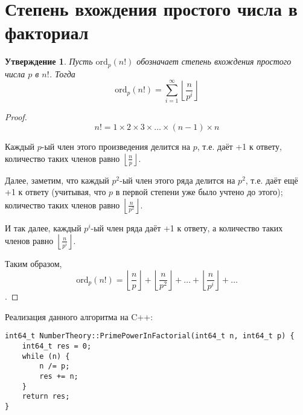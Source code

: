 \documentclass[12pt, a4paper, openany]{book}
\newtheorem*{statement}{Утверждение}
\begin{document}
\section{Степень вхождения простого числа в факториал}

\begin{statement}
Пусть $\text{ord}_p(n!)$ обозначает степень вхождения простого числа $p$ в $n!$. Тогда
\[\text{ord}_p(n!) = \sum_{i=1}^{\infty} \left\lfloor \frac{n}{p^i} \right\rfloor\]
\end{statement}

\begin{proof}
\[n! = 1 \times 2 \times 3 \times \ldots \times (n-1) \times n\]

Каждый $p$-ый член этого произведения делится на $p$, т.е. даёт +1 к ответу, количество таких членов равно $\left\lfloor \frac{n}{p} \right\rfloor.$

Далее, заметим, что каждый $p^2$-ый член этого ряда делится на $p^2$, т.е. даёт ещё +1 к ответу (учитывая, что $p$ в первой степени уже было учтено до этого); количество таких членов равно $\left\lfloor \frac{n}{p^2} \right\rfloor$.

И так далее, каждый $p^i$-ый член ряда даёт +1 к ответу, а количество таких членов равно $\left\lfloor \frac{n}{p^i} \right\rfloor.$

Таким образом, \[\text{ord}_p(n!) = \left\lfloor\frac{n}{p}\right\rfloor + \left\lfloor\frac{n}{p^2}\right\rfloor + \ldots + \left\lfloor\frac{n}{p^i}\right\rfloor + \ldots\].
\end{proof}

\newpage

\noindent
Реализация данного алгоритма на C++:
\begin{lstlisting}[breaklines=true]
int64_t NumberTheory::PrimePowerInFactorial(int64_t n, int64_t p) {
	int64_t res = 0;
	while (n) {
		n /= p;
		res += n;
	}
	return res;
}
\end{lstlisting}
\end{document}
